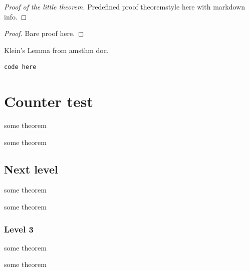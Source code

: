 \begin{proof}[Proof of the \emph{little} theorem]
Predefined proof theoremstyle here with markdown info.
\end{proof}

\begin{proof}
Bare proof here.
\end{proof}

\begin{KL}
Klein's Lemma from amsthm doc.
\end{KL}

\begin{Definition}

\begin{verbatim}
code here
\end{verbatim}

\end{Definition}

\chapter{Counter test}\label{counter-test}

\begin{Theorem}
some theorem
\end{Theorem}

\begin{Theorem}
some theorem
\end{Theorem}

\section{Next level}\label{next-level}

\begin{Theorem}
some theorem
\end{Theorem}

\begin{Theorem}
some theorem
\end{Theorem}

\subsection{Level 3}\label{level-3}

\begin{Theorem}
some theorem
\end{Theorem}

\begin{Theorem}
some theorem
\end{Theorem}

